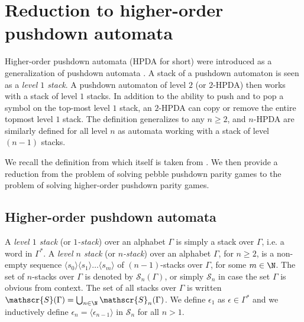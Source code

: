 \section{Reduction to higher-order pushdown automata}\label{section HPDA}




Higher-order pushdown automata (HPDA for short) were introduced as a 
generalization of pushdown automata \cite{aho1969nested,Gre70,maslov1976multilevel}. 
A stack of a pushdown automaton is seen as a {\em level $1$ stack}. 
A pushdown automaton of level $2$ (or $2$-HPDA) then works with a stack of level $1$ stacks. 
In addition to the ability to push
and to pop a symbol on the top-most level $1$ stack, an $2$-HPDA can copy or remove the entire topmost level $1$ stack. 
The definition generalizes to any $n \geq 2$, and $n$-HPDA are similarly defined for all level
$n$ as automata working with a stack of level $(n-1)$ stacks.



We recall the definition from \cite{cachat2007complexity} which itself is taken from \cite{knapik2002higher}. We then provide a
reduction from the problem of solving pebble pushdown parity games to the problem of solving
higher-order pushdown parity games.


\subsection{Higher-order pushdown automata}

A {\em level $1$ stack} (or {\em $1$-stack}) over an alphabet $\Gamma$ is 
simply a %
	stack over $\Gamma$, i.e. a word  in $\Gamma^*$.
A  {\em level $n$ stack} (or {\em $n$-stack}) over an alphabet $\Gamma$, for $n \geq 2$, is a 
non-empty sequence
$ \langle s_0 \rangle \langle s_1 \rangle \ldots \langle s_m \rangle$
of
$(n-1)$-stacks over $\Gamma$,
for some $m \in \N$.
The set of $n$-stacks over $\Gamma$ is denoted by $\mathscr{S}_n(\Gamma)$,
or simply $\mathscr{S}_n$ in case the set $\Gamma$ is obvious from context.
The set of all stacks over $\Gamma$ is written $\mathscr{S}(\Gamma) = \bigcup_{n\in \N} \mathscr{S}_n(\Gamma)$.
We define $\epsilon_{1}$ as
$\epsilon \in \Gamma^*$ and we inductively define 
$\epsilon_{n} = \langle \epsilon_{n-1} \rangle$ in $\mathscr{S}_n$ for all $n > 1$.





